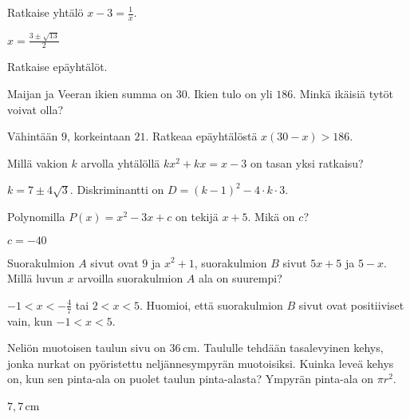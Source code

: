 \begin{tehtava}
Ratkaise yhtälö $x - 3 = \frac{1}{x}$.
    \begin{vastaus}
    $x =\frac{3 \pm \sqrt{13}}{2}$
    \end{vastaus}
\end{tehtava}

\begin{tehtava} 
Ratkaise epäyhtälöt.
    \begin{vastaus}
    \end{vastaus}
\end{tehtava}

\begin{tehtava} 
Maijan ja Veeran ikien summa on $30$. Ikien tulo on yli $186$. Minkä ikäisiä tytöt voivat olla?
    \begin{vastaus}
	Vähintään $9$, korkeintaan $21$. Ratkeaa epäyhtälöstä $x(30-x)>186$.
	\end{vastaus}
\end{tehtava}

\begin{tehtava} 
Millä vakion $k$ arvolla yhtälöllä $kx^2+kx=x-3$ on tasan yksi ratkaisu?
    \begin{vastaus}
		$k = 7 \pm 4 \sqrt{3}$. Diskriminantti on $D = (k-1)^2-4\cdot k \cdot 3$.
    \end{vastaus}
\end{tehtava}

\begin{tehtava} 
Polynomilla $P(x)=x^2-3x+c$ on tekijä $x+5$. Mikä on $c$?
    \begin{vastaus}
		$c=-40$
    \end{vastaus}
\end{tehtava}

\begin{tehtava} 
Suorakulmion $A$ sivut ovat $9$ ja $x^2+1$, suorakulmion $B$ sivut $5x+5$
ja $5-x$. Millä luvun $x$ arvoilla suorakulmion $A$ ala on suurempi?
    \begin{vastaus}
	$-1 < x < -\frac{4}{7}$ tai $2 < x < 5$. Huomioi, että suorakulmion $B$
    sivut ovat positiiviset vain, kun $-1<x<5$.
    \end{vastaus}
\end{tehtava}

\begin{tehtava} %
Neliön muotoisen taulun sivu on $36$\,cm. Taululle tehdään tasalevyinen kehys, jonka nurkat on pyöristettu neljännesympyrän muotoisiksi. Kuinka leveä kehys on, kun sen pinta-ala on puolet taulun pinta-alasta? Ympyrän pinta-ala on $\pi r^2$.
    \begin{vastaus}
     $7,7$\,cm
    \end{vastaus}
\end{tehtava}

